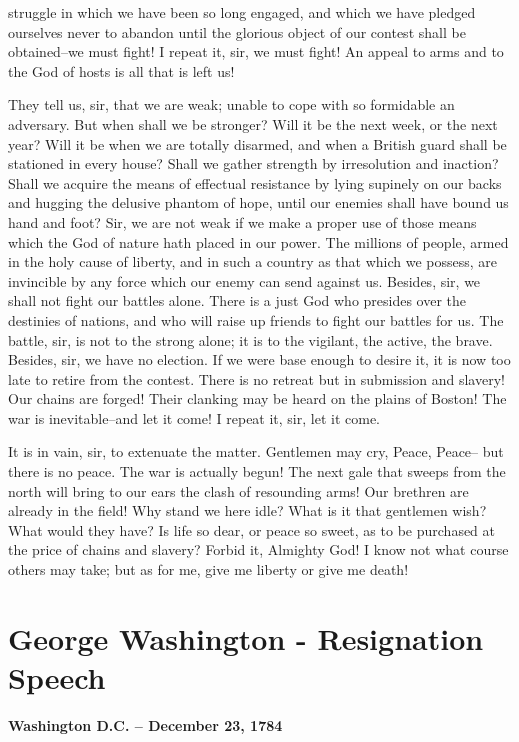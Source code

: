 \documentclass[a4paper]{amsbook}
\begin{document}
struggle in which we have been so long engaged, and which we have pledged ourselves never to abandon until the glorious object of our contest shall be obtained–we must fight! I repeat it, sir, we must fight! An appeal to arms and to the God of hosts is all that is left us!

They tell us, sir, that we are weak; unable to cope with so formidable an adversary. But when shall we be stronger? Will it be the next week, or the next year? Will it be when we are totally disarmed, and when a British guard shall be stationed in every house? Shall we gather strength by irresolution and inaction? Shall we acquire the means of effectual resistance by lying supinely on our backs and hugging the delusive phantom of hope, until our enemies shall have bound us hand and foot? Sir, we are not weak if we make a proper use of those means which the God of nature hath placed in our power. The millions of people, armed in the holy cause of liberty, and in such a country as that which we possess, are invincible by any force which our enemy can send against us. Besides, sir, we shall not fight our battles alone. There is a just God who presides over the destinies of nations, and who will raise up friends to fight our battles for us. The battle, sir, is not to the strong alone; it is to the vigilant, the active, the brave. Besides, sir, we have no election. If we were base enough to desire it, it is now too late to retire from the contest. There is no retreat but in submission and slavery! Our chains are forged! Their clanking may be heard on the plains of Boston! The war is inevitable–and let it come! I repeat it, sir, let it come.

It is in vain, sir, to extenuate the matter. Gentlemen may cry, Peace, Peace– but there is no peace. The war is actually begun! The next gale that sweeps from the north will bring to our ears the clash of resounding arms! Our brethren are already in the field! Why stand we here idle? What is it that gentlemen wish? What would they have? Is life so dear, or peace so sweet, as to be purchased at the price of chains and slavery? Forbid it, Almighty God! I know not what course others may take; but as for me, give me liberty or give me death!


\chapter{George Washington - Resignation Speech}

\textbf{\Large{Washington D.C. -- December 23, 1784 }}
\end{document}
